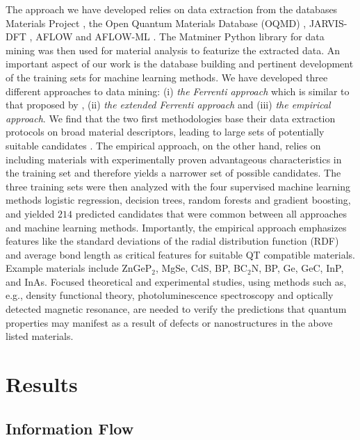 \documentclass[superscriptaddress,unsortedaddress,
 amsmath,amssymb,
 aps,
]{revtex4-2}
\begin{document}
The approach we have developed relies on data extraction from the databases Materials Project \cite{Jain2013,Jain2018}, the Open Quantum Materials Database (OQMD) \cite{Saal2013, Kirklin2015}, JARVIS-DFT \cite{Choudhary2020}, AFLOW \cite{Curtarolo2012, Curtarolo2012a, Calderon2015} and AFLOW-ML \cite{Isayev2017}. 
The Matminer Python library for data mining \cite{Ward2018} was then used for material analysis to featurize the extracted data. An important aspect of our work is the database building and pertinent development of the training sets for machine learning methods. We have developed three different approaches to data mining: (i) \emph{the Ferrenti approach} which is similar to that proposed by \citeauthor{Ferrenti2020} \cite{Ferrenti2020}, (ii) 
\emph{the extended Ferrenti approach} and (iii) \emph{the empirical approach}. We find that the %
two first methodologies base their data extraction protocols on broad material descriptors, leading to large sets of potentially suitable candidates \cite{Mehta2019,Hastie2009}. The  
empirical approach, on the other hand, relies on including materials with experimentally proven advantageous characteristics in the training set and therefore yields a narrower set of possible candidates.  The three training sets were then analyzed with the four supervised machine learning methods logistic regression, decision trees, random forests and gradient boosting, and yielded $214$ predicted candidates that were common between all approaches and machine learning methods. Importantly, the empirical approach emphasizes features like the standard deviations  of  the  radial  distribution  function  (RDF) and average bond length as critical features for suitable QT compatible materials.
Example materials include ZnGeP$_2$, MgSe, CdS, BP, BC$_2$N, BP, Ge, GeC, InP, and InAs. 
Focused theoretical and experimental studies, using methods such as, e.g., density functional theory, photoluminescence spectroscopy and optically detected magnetic resonance, are needed to verify the predictions that quantum properties may manifest as a result of defects or nanostructures in the above listed materials. 

\section*{Results}

\subsection*{Information Flow} 
\end{document}
